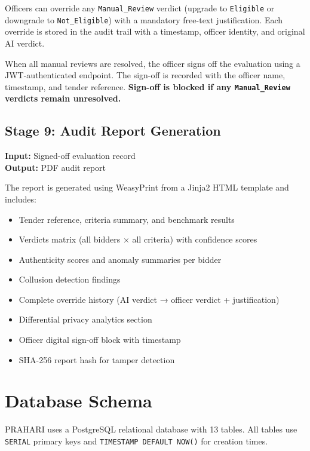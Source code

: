 \documentclass[12pt,a4paper]{article}
\begin{document}
Officers can override any \texttt{Manual\_Review} verdict (upgrade to
\texttt{Eligible} or downgrade to \texttt{Not\_Eligible}) with a mandatory
free-text justification. Each override is stored in the audit trail with a
timestamp, officer identity, and original AI verdict.

When all manual reviews are resolved, the officer signs off the evaluation using
a JWT-authenticated endpoint. The sign-off is recorded with the officer name,
timestamp, and tender reference. \textbf{Sign-off is blocked if any
\texttt{Manual\_Review} verdicts remain unresolved.}

\subsection{Stage 9: Audit Report Generation}

\textbf{Input:} Signed-off evaluation record \\
\textbf{Output:} PDF audit report

The report is generated using WeasyPrint from a Jinja2 HTML template and includes:
\begin{itemize}
\item Tender reference, criteria summary, and benchmark results
\item Verdicts matrix (all bidders × all criteria) with confidence scores
\item Authenticity scores and anomaly summaries per bidder
\item Collusion detection findings
\item Complete override history (AI verdict → officer verdict + justification)
\item Differential privacy analytics section
\item Officer digital sign-off block with timestamp
\item SHA-256 report hash for tamper detection
\end{itemize}

\section{Database Schema}

PRAHARI uses a PostgreSQL relational database with 13 tables. All tables use
\texttt{SERIAL} primary keys and \texttt{TIMESTAMP DEFAULT NOW()} for creation times.
\end{document}
